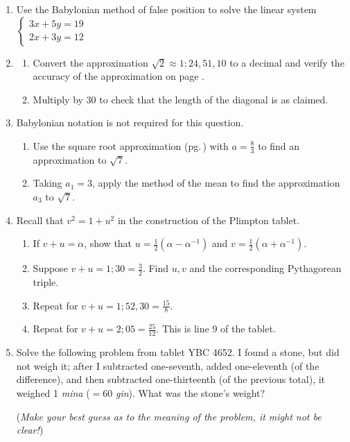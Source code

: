 \begin{exercises*}{}{}
\begin{enumerate}
	\item Use the Babylonian method of false position to solve the linear system $\begin{cases}
	3x+5y=19\\
	2x+3y=12
	\end{cases}$
  
  \item%
  \begin{enumerate}
    \item Convert the approximation $\sqrt 2\approx 1;24,51,10$ to a decimal and verify the accuracy of the approximation on page \pageref{ybc7289}.
    \item Multiply by 30 to check that the length of the diagonal is as claimed.
  \end{enumerate}
  
  \item Babylonian notation is not required for this question.
  \begin{enumerate}
    \item Use the square root approximation (pg.\,\pageref{babroot}) with $a=\frac 83$ to find an approximation to $\sqrt 7$.
    \item Taking $a_1=3$, apply the method of the mean to find the approximation $a_3$ to $\sqrt 7$.
  \end{enumerate}
  
  \item\label{exs:plimpton}%
  Recall that $v^2=1+u^2$ in the construction of the Plimpton tablet.
  \begin{enumerate}
    \item If $v+u=\alpha$, show that $u=\frac 12(\alpha-\alpha^{-1})$ and $v=\frac 12(\alpha+\alpha^{-1})$.
    \item Suppose $v+u=1;30=\frac 32$. Find $u,v$ and the corresponding Pythagorean triple.
  	\item Repeat for $v+u=1;52,30=\frac{15}8$.
  	\item Repeat for $v+u=2;05=\frac{25}{12}$. This is line 9 of the tablet.
  \end{enumerate}

  
  \item%
  Solve the following problem from tablet YBC 4652. I found a stone, but did not weigh it; after I subtracted one-seventh, added one-eleventh (of the difference), and then subtracted one-thirteenth (of the previous total), it weighed 1 \emph{mina} ($=60$ \emph{gin}). What was the stone's weight?\par
  (\emph{Make your best guess as to the meaning of the problem, it might not be clear!})
  

\end{enumerate}
\end{exercises*}
